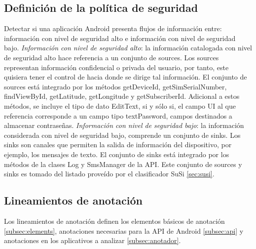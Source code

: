 \subsection{Definición de la política de seguridad}
Detectar si una aplicación Android presenta flujos de información entre:
información con nivel de seguridad alto e información con nivel de seguridad bajo.\newline
\textit{Información con nivel de seguridad alto}: la información
catalogada con nivel de seguridad alto hace referencia a un conjunto de sources.
Los sources representan información confidencial o privada del usuario, por
tanto, este quisiera tener el control de hacia donde se dirige tal información.
El conjunto de sources está integrado por los métodos getDeviceId,
getSimSerialNumber, findViewById, getLatitude, getLongitude y getSubscriberId.
Adicional a estos métodos, se incluye el tipo de dato EditText, si y sólo si, el
campo UI al que referencia corresponde a un campo tipo textPassword, campos
destinados a almacenar contraseñas.\newline 
\textit{Información con nivel de seguridad bajo}: la
información considerada con nivel de seguridad bajo, comprende un conjunto
de sinks. Los sinks son canales que permiten la salida de información del
dispositivo, por ejemplo, los mensajes de texto. El conjunto de sinks
está integrado por los métodos de la clases Log y SmsManager de la API.\newline
Este conjunto de sources y sinks es tomado del listado proveído por el
clasificador SuSi \ref{sec:susi}.

\subsection{Lineamientos de anotación}
Los lineamientos de anotación definen los elementos básicos de anotación
\ref{subsec:elements}, anotaciones necesarias para la API de Android
\ref{subsec:api} y anotaciones en los aplicativos a analizar \ref{subsec:anotador}.

